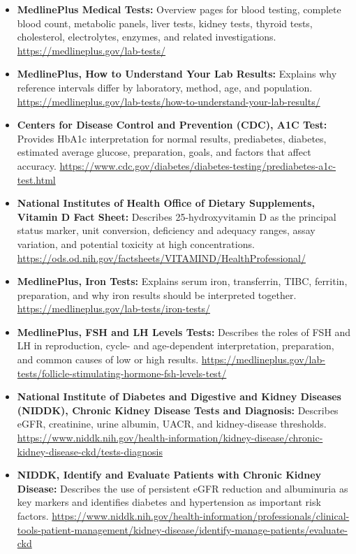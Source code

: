 \documentclass[11pt,openany]{book}
\begin{document}
\sloppy
\begin{itemize}[leftmargin=*]
  \item \textbf{MedlinePlus Medical Tests:} Overview pages for blood testing, complete blood count, metabolic panels, liver tests, kidney tests, thyroid tests, cholesterol, electrolytes, enzymes, and related investigations. \url{https://medlineplus.gov/lab-tests/}
  \item \textbf{MedlinePlus, How to Understand Your Lab Results:} Explains why reference intervals differ by laboratory, method, age, and population. \url{https://medlineplus.gov/lab-tests/how-to-understand-your-lab-results/}
  \item \textbf{Centers for Disease Control and Prevention (CDC), A1C Test:} Provides HbA1c interpretation for normal results, prediabetes, diabetes, estimated average glucose, preparation, goals, and factors that affect accuracy. \url{https://www.cdc.gov/diabetes/diabetes-testing/prediabetes-a1c-test.html}
  \item \textbf{National Institutes of Health Office of Dietary Supplements, Vitamin D Fact Sheet:} Describes 25-hydroxyvitamin D as the principal status marker, unit conversion, deficiency and adequacy ranges, assay variation, and potential toxicity at high concentrations. \url{https://ods.od.nih.gov/factsheets/VITAMIND/HealthProfessional/}
  \item \textbf{MedlinePlus, Iron Tests:} Explains serum iron, transferrin, TIBC, ferritin, preparation, and why iron results should be interpreted together. \url{https://medlineplus.gov/lab-tests/iron-tests/}
  \item \textbf{MedlinePlus, FSH and LH Levels Tests:} Describes the roles of FSH and LH in reproduction, cycle- and age-dependent interpretation, preparation, and common causes of low or high results. \url{https://medlineplus.gov/lab-tests/follicle-stimulating-hormone-fsh-levels-test/}
  \item \textbf{National Institute of Diabetes and Digestive and Kidney Diseases (NIDDK), Chronic Kidney Disease Tests and Diagnosis:} Describes eGFR, creatinine, urine albumin, UACR, and kidney-disease thresholds. \url{https://www.niddk.nih.gov/health-information/kidney-disease/chronic-kidney-disease-ckd/tests-diagnosis}
  \item \textbf{NIDDK, Identify and Evaluate Patients with Chronic Kidney Disease:} Describes the use of persistent eGFR reduction and albuminuria as key markers and identifies diabetes and hypertension as important risk factors. \url{https://www.niddk.nih.gov/health-information/professionals/clinical-tools-patient-management/kidney-disease/identify-manage-patients/evaluate-ckd}

\end{itemize}
\end{document}
